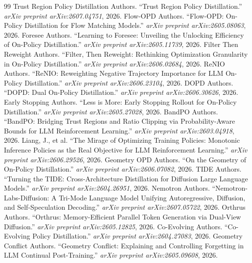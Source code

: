 \documentclass[11pt,a4paper]{article}
\begin{document}
\begin{thebibliography}{99}
 Trust Region Policy Distillation Authors. ``Trust Region Policy Distillation.'' \emph{arXiv preprint arXiv:2607.04751}, 2026.
 Flow-OPD Authors. ``Flow-OPD: On-Policy Distillation for Flow Matching Models.'' \emph{arXiv preprint arXiv:2605.08063}, 2026.
 Foresee Authors. ``Learning to Foresee: Unveiling the Unlocking Efficiency of On-Policy Distillation.'' \emph{arXiv preprint arXiv:2605.11739}, 2026.
 Filter Then Reweight Authors. ``Filter, Then Reweight: Rethinking Optimization Granularity in On-Policy Distillation.'' \emph{arXiv preprint arXiv:2606.02684}, 2026.
 ReNIO Authors. ``ReNIO: Reweighting Negative Trajectory Importance for LLM On-Policy Distillation.'' \emph{arXiv preprint arXiv:2606.23104}, 2026.
 DOPD Authors. ``DOPD: Dual On-Policy Distillation.'' \emph{arXiv preprint arXiv:2606.30626}, 2026.
 Early Stopping Authors. ``Less is More: Early Stopping Rollout for On-Policy Distillation.'' \emph{arXiv preprint arXiv:2605.27028}, 2026.
 BandPO Authors. ``BandPO: Bridging Trust Regions and Ratio Clipping via Probability-Aware Bounds for LLM Reinforcement Learning.'' \emph{arXiv preprint arXiv:2603.04918}, 2026.
 Liang, J., et al. ``The Mirage of Optimizing Training Policies: Monotonic Inference Policies as the Real Objective for LLM Reinforcement Learning.'' \emph{arXiv preprint arXiv:2606.29526}, 2026.
 Geometry OPD Authors. ``On the Geometry of On-Policy Distillation.'' \emph{arXiv preprint arXiv:2606.07082}, 2026.
 TIDE Authors. ``Turning the TIDE: Cross-Architecture Distillation for Diffusion Large Language Models.'' \emph{arXiv preprint arXiv:2604.26951}, 2026.
 Nemotron Authors. ``Nemotron-Labs-Diffusion: A Tri-Mode Language Model Unifying Autoregressive, Diffusion, and Self-Speculation Decoding.'' \emph{arXiv preprint arXiv:2607.05722}, 2026.
 Orthrus Authors. ``Orthrus: Memory-Efficient Parallel Token Generation via Dual-View Diffusion.'' \emph{arXiv preprint arXiv:2605.12825}, 2026.
 Co-Evolving Authors. ``Co-Evolving Policy Distillation.'' \emph{arXiv preprint arXiv:2604.27083}, 2026.
 Geometry Conflict Authors. ``Geometry Conflict: Explaining and Controlling Forgetting in LLM Continual Post-Training.'' \emph{arXiv preprint arXiv:2605.09608}, 2026.
\end{thebibliography}
\end{document}
